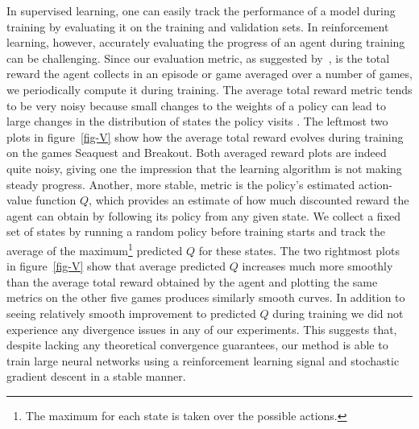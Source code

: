 \documentclass{article} %
\begin{document}
In supervised learning, one can easily track the performance of a model during training by evaluating it on the training and validation sets. In reinforcement learning, however, accurately evaluating the progress of an agent during training can be challenging. 
Since our evaluation metric, as suggested by~\cite{bellemare-ale}, is the total reward the agent collects in an episode or game averaged over a number of games, we periodically compute it during training. The average total reward metric tends to be very noisy because small changes to the weights of a policy can lead to large changes in the distribution of states the policy visits .  The leftmost two plots in figure~\ref{fig-V} show how the average total reward evolves during training on the games Seaquest and Breakout.  Both averaged reward plots are indeed quite noisy, giving one the impression that the learning algorithm is not making steady progress.  Another, more stable, metric is the policy's estimated action-value function $Q$, which provides an estimate of how much discounted reward the agent can obtain by following its policy from any given state.  We collect a fixed set of states by running a random policy before training starts and track the average of the maximum\footnote{The maximum for each state is taken over the possible actions.} predicted $Q$ for these states.  The two rightmost plots in figure~\ref{fig-V} show that average predicted $Q$ increases much more smoothly than the average total reward obtained by the agent and plotting the same metrics on the other five games produces similarly smooth curves.
In addition to seeing relatively smooth improvement to predicted $Q$ during training we did not experience any divergence issues in any of our experiments.  This suggests that, despite lacking any theoretical convergence guarantees, our method is able to train large neural networks using a reinforcement learning signal and stochastic gradient descent in a stable manner.  

\end{document}
